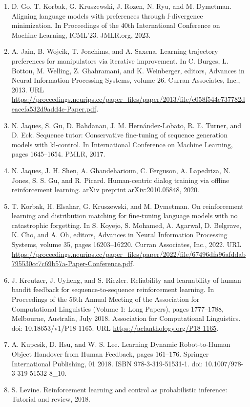 \documentclass[11pt,UTF8,fontset=fandol]{ctexart}
\begin{document}
\begin{enumerate}[leftmargin=2.2em, itemsep=2pt]
\item D. Go, T. Korbak, G. Kruszewski, J. Rozen, N. Ryu, and M. Dymetman. Aligning language models with preferences through f-divergence minimization. In Proceedings of the 40th International Conference on Machine Learning, ICML'23. JMLR.org, 2023.
\item A. Jain, B. Wojcik, T. Joachims, and A. Saxena. Learning trajectory preferences for manipulators via iterative improvement. In C. Burges, L. Bottou, M. Welling, Z. Ghahramani, and K. Weinberger, editors, Advances in Neural Information Processing Systems, volume 26. Curran Associates, Inc., 2013. URL \url{https://proceedings.neurips.cc/paper_files/paper/2013/file/c058f544c737782deacefa532d9add4c-Paper.pdf}.
\item N. Jaques, S. Gu, D. Bahdanau, J. M. Hern\'andez-Lobato, R. E. Turner, and D. Eck. Sequence tutor: Conservative fine-tuning of sequence generation models with kl-control. In International Conference on Machine Learning, pages 1645--1654. PMLR, 2017.
\item N. Jaques, J. H. Shen, A. Ghandeharioun, C. Ferguson, A. Lapedriza, N. Jones, S. S. Gu, and R. Picard. Human-centric dialog training via offline reinforcement learning. arXiv preprint arXiv:2010.05848, 2020.
\item T. Korbak, H. Elsahar, G. Kruszewski, and M. Dymetman. On reinforcement learning and distribution matching for fine-tuning language models with no catastrophic forgetting. In S. Koyejo, S. Mohamed, A. Agarwal, D. Belgrave, K. Cho, and A. Oh, editors, Advances in Neural Information Processing Systems, volume 35, pages 16203--16220. Curran Associates, Inc., 2022. URL \url{https://proceedings.neurips.cc/paper_files/paper/2022/file/67496dfa96afddab795530cc7c69b57a-Paper-Conference.pdf}.
\item J. Kreutzer, J. Uyheng, and S. Riezler. Reliability and learnability of human bandit feedback for sequence-to-sequence reinforcement learning. In Proceedings of the 56th Annual Meeting of the Association for Computational Linguistics (Volume 1: Long Papers), pages 1777--1788, Melbourne, Australia, July 2018. Association for Computational Linguistics. doi: 10.18653/v1/P18-1165. URL \url{https://aclanthology.org/P18-1165}.
\item A. Kupcsik, D. Hsu, and W. S. Lee. Learning Dynamic Robot-to-Human Object Handover from Human Feedback, pages 161--176. Springer International Publishing, 01 2018. ISBN 978-3-319-51531-1. doi: 10.1007/978-3-319-51532-8\_10.
\item S. Levine. Reinforcement learning and control as probabilistic inference: Tutorial and review, 2018.

\end{enumerate}
\end{document}
